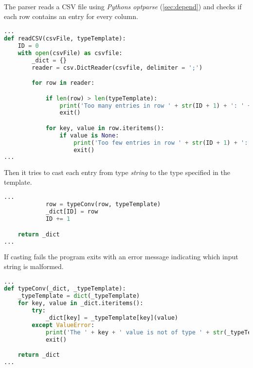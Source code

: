 The parser reads a CSV file using \textit{Pythons optparse} (\ref{sec:depend}) and checks if each row contains an entry for every column.

\begin{inconsolata}
\begin{minipage}{\linewidth}
\begin{lstlisting}[language=python]
...
def readCSV(csvFile, typeTemplate):
    ID = 0
    with open(csvFile) as csvfile:
        _dict = {}
        reader = csv.DictReader(csvfile, delimiter = ';')

        for row in reader:

            if len(row) > len(typeTemplate):
                print('Too many entries in row ' + str(ID + 1) + ': ' + csvFile)
                exit()

            for key, value in row.iteritems():
                if value is None:
                    print('Too few entries in row ' + str(ID + 1) + ': ' + csvFile)
                    exit()
...
\end{lstlisting}
\end{minipage}
\end{inconsolata}

Then it tries to cast each entry from type \textit{string} to the type specified in the template.

\begin{inconsolata}
\begin{minipage}{\linewidth}
\begin{lstlisting}[language=python]
...
            row = typeConv(row, typeTemplate)
            _dict[ID] = row
            ID += 1

    return _dict
...
\end{lstlisting}
\end{minipage}
\end{inconsolata}

If casting fails the program exits with an error message indicating which input string is malformed.

\begin{inconsolata}
\begin{minipage}{\linewidth}
\begin{lstlisting}[language=python]
...
def typeConv(_dict, _typeTemplate):
    _typeTemplate = dict(_typeTemplate)
    for key, value in _dict.iteritems():
        try:
            _dict[key] = _typeTemplate[key](value)
        except ValueError:
            print('The ' + key + ' value is not of type ' + str(_typeTemplate[key]) + '.')
            exit()

    return _dict
...
\end{lstlisting}
\end{minipage}
\end{inconsolata}

